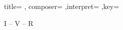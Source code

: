 \documentclass{leadsheet-modern}
\begin{document}
\begin{song}[
]{
title={%
},
composer={%
},interpret={%
},key={%
}
}

\begin{schedule}
I -- V -- R
\end{schedule}

\begin{intro}
\end{intro}

\begin{verse}
\end{verse}

\begin{chorus}
\end{chorus}

\end{song}
\end{document}
